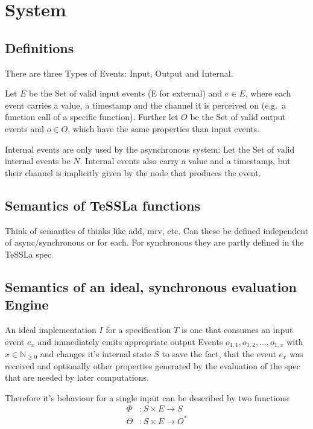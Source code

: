 %
\chapter{System}
\label{sec:system}

\section{Definitions}
\label{sec:system:defs}

There are three Types of Events: Input, Output and Internal.

Let \(E\) be the Set of valid input events (E for external) and \(e \in E\), where each event carries a value, a timestamp and the
channel it is perceived on (e.g.\ a function call of a specific function).
Further let \(O\) be the Set of valid output events and \(o \in O\), which have the same properties than input events.

Internal events are only used by the asynchronous system: Let the Set of valid internal events be \(N\).
Internal events also carry a value and a timestamp, but their channel is implicitly given by the node that produces the event.

\section{Semantics of TeSSLa functions}
\label{sec:system:semantics_tessla_functions}
Think of semantics of thinks like add, mrv, etc.
Can these be defined independent of async/synchronous or for each.
For synchronous they are partly defined in the TeSSLa spec

\section{Semantics of an ideal, synchronous evaluation Engine}
\label{sec:system:semantics_ideal}
An ideal implementation \(I\) for a specification \(T\) is one that consumes an input event \(e_x\) and immediately emits
appropriate output Events \(o_{1,1}, o_{1,2}, \dots , o_{1,x}\) with \(x \in \mathbb{N}_{\ge0}\) and changes it's internal
state \(S\) to save the fact, that the event \(e_x\) was received and optionally other properties generated by the
evaluation of the spec that are needed by later computations.

Therefore it's behaviour for a single input can be described by two functions:
\begin{align*}
    \Phi&: S \times E \rightarrow S \\
    \Theta&: S \times E \rightarrow O^*
\end{align*}

